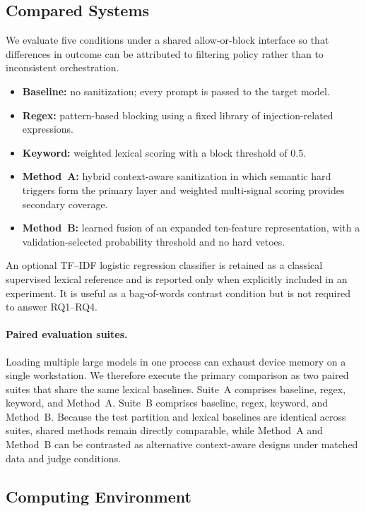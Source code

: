 \subsection{Compared Systems}
\label{sec:compared-systems}

We evaluate five conditions under a shared allow-or-block interface so that differences in outcome can be attributed to filtering policy rather than to inconsistent orchestration.

\begin{itemize}
  \item \textbf{Baseline:} no sanitization; every prompt is passed to the target model.
  \item \textbf{Regex:} pattern-based blocking using a fixed library of injection-related expressions.
  \item \textbf{Keyword:} weighted lexical scoring with a block threshold of 0.5.
  \item \textbf{Method~A:} hybrid context-aware sanitization in which semantic hard triggers form the primary layer and weighted multi-signal scoring provides secondary coverage.
  \item \textbf{Method~B:} learned fusion of an expanded ten-feature representation, with a validation-selected probability threshold and no hard vetoes.
\end{itemize}

An optional TF--IDF logistic regression classifier is retained as a classical supervised lexical reference and is reported only when explicitly included in an experiment.
It is useful as a bag-of-words contrast condition but is not required to answer RQ1--RQ4.

\paragraph{Paired evaluation suites.}
Loading multiple large models in one process can exhaust device memory on a single workstation.
We therefore execute the primary comparison as two paired suites that share the same lexical baselines.
Suite~A comprises baseline, regex, keyword, and Method~A.
Suite~B comprises baseline, regex, keyword, and Method~B.
Because the test partition and lexical baselines are identical across suites, shared methods remain directly comparable, while Method~A and Method~B can be contrasted as alternative context-aware designs under matched data and judge conditions.

\subsection{Computing Environment}
\label{sec:hardware}

